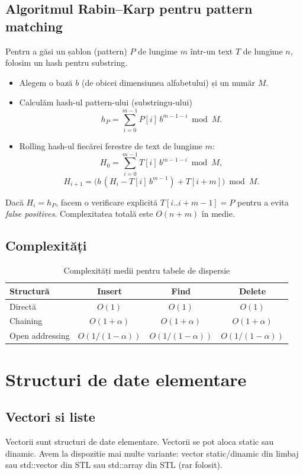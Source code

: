 \documentclass[11pt,a4paper]{article}
\theoremstyle{definition}
\theoremstyle{plain}
\theoremstyle{remark}
\begin{document}
\subsection{Algoritmul Rabin--Karp pentru pattern matching}
Pentru a găsi un șablon (pattern) $P$ de lungime $m$ într-un text $T$ de lungime $n$, folosim un hash pentru substring.
\begin{itemize}
  \item Alegem o bază $b$ (de obicei dimensiunea alfabetului) și un număr $M$.
  \item Calculăm hash-ul pattern-ului (substringu-ului)
  $$h_P = \sum_{i=0}^{m-1} P[i]\,b^{m-1-i} \bmod M.$$
  \item Rolling hash-ul fiecărei ferestre de text de lungime $m$:
  $$H_{0} = \sum_{i=0}^{m-1} T[i]\,b^{m-1-i} \bmod M,$$
  $$H_{i+1} = \bigl(b\,(H_i - T[i]\,b^{m-1}) + T[i+m]\bigr) \bmod M.$$
\end{itemize}
Dacă $H_i = h_P$, facem o verificare explicită $T[i..i+m-1]=P$ pentru a evita \emph{false positives}. Complexitatea totală este $O(n+m)$ în medie.


\subsection{Complexități}
\begin{table}[H]
\centering
\begin{tabular}{l|ccc}
\textbf{Structură} & \textbf{Insert} & \textbf{Find} & \textbf{Delete} \\
\hline
Directă & $O(1)$ & $O(1)$ & $O(1)$ \\
Chaining & $O(1+\alpha)$ & $O(1+\alpha)$ & $O(1+\alpha)$ \\
Open addressing & $O(1/(1-\alpha))$ & $O(1/(1-\alpha))$ & $O(1/(1-\alpha))$ \\
\end{tabular}
\caption{Complexități medii pentru tabele de dispersie}
\label{tbl:complexitati}
\end{table}

\section {Structuri de date elementare}

\subsection{Vectori si liste}
Vectorii sunt structuri de date elementare. Vectorii se pot aloca static sau dinamic. Avem la dispozitie mai multe variante: vector static/dinamic din limbaj sau std::vector din STL sau std::array din STL (rar folosit).
\end{document}

